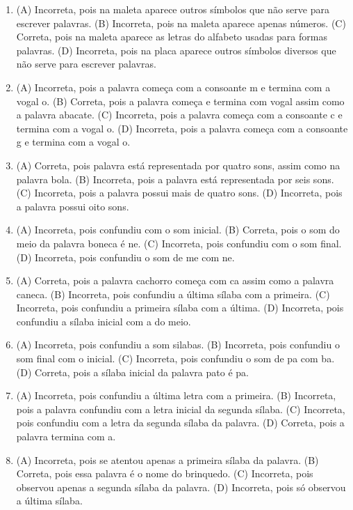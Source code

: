
\begin{enumerate}
\item
(A) Incorreta, pois na maleta aparece outros símbolos que não serve
para escrever palavras.
(B) Incorreta, pois na maleta aparece apenas números.
(C) Correta, pois na maleta aparece as letras do alfabeto usadas para
formas palavras.
(D) Incorreta, pois na placa aparece outros símbolos diversos que não
serve para escrever palavras.

\item
(A) Incorreta, pois a palavra começa com a consoante m e termina com a vogal o.
(B) Correta, pois a palavra começa e termina com vogal assim como a
palavra abacate.
(C) Incorreta, pois a palavra começa com a consoante c e termina com a
vogal o.
(D) Incorreta, pois a palavra começa com a consoante g e termina com a
vogal o.

\item
(A) Correta, pois palavra está representada por quatro sons, assim como
na palavra bola.
(B) Incorreta, pois a palavra está representada por seis sons.
(C) Incorreta, pois a palavra possui mais de quatro sons.
(D) Incorreta, pois a palavra possui oito sons.

\item
(A) Incorreta, pois confundiu com o som inicial.
(B) Correta, pois o som do meio da palavra boneca é ne.
(C) Incorreta, pois confundiu com o som final.
(D) Incorreta, pois confundiu o som de me com ne.

\item
(A) Correta, pois a palavra cachorro começa com ca assim como a palavra
caneca.
(B) Incorreta, pois confundiu a última sílaba com a primeira.
(C) Incorreta, pois confundiu a primeira sílaba com a última.
(D) Incorreta, pois confundiu a sílaba inicial com a do meio.

\item
(A) Incorreta, pois confundiu a som silabas.
(B) Incorreta, pois confundiu o som final com o inicial.
(C) Incorreta, pois confundiu o som de pa com ba.
(D) Correta, pois a sílaba inicial da palavra pato é pa.

\item
(A) Incorreta, pois confundiu a última letra com a primeira.
(B) Incorreta, pois a palavra confundiu com a letra inicial da segunda
sílaba.
(C) Incorreta, pois confundiu com a letra da segunda sílaba da palavra.
(D) Correta, pois a palavra termina com a.

\item
(A) Incorreta, pois se atentou apenas a primeira sílaba da palavra.
(B) Correta, pois essa palavra é o nome do brinquedo.
(C) Incorreta, pois observou apenas a segunda sílaba da palavra.
(D) Incorreta, pois só observou a última sílaba.


\end{enumerate}

